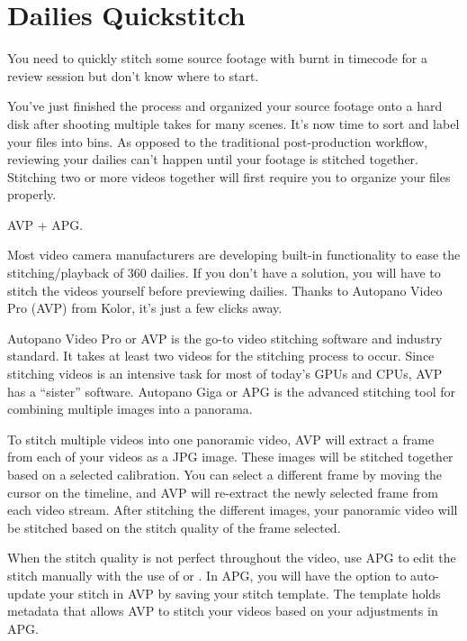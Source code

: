 \section{Dailies Quickstitch}
\pagecolor{white}
\label{chap:30}
\begin{fullwidth}

\problem

{\large You need to quickly stitch some source footage with burnt in timecode for a review session but don't know where to start. \par}

You've just finished the \textbf{} process and organized your source footage onto a hard disk after shooting multiple takes for many scenes. It's now time to sort and label your files into bins. As opposed to the traditional post-production workflow, reviewing your dailies can't happen until your footage is stitched together. Stitching two or more videos together will first require you to organize your files properly.

\solution

{\large AVP + APG. \par}

Most video camera manufacturers are developing built-in functionality to ease the stitching/playback of 360 dailies. If you don't have a \textbf{} solution, you will have to stitch the videos yourself before previewing dailies. Thanks to Autopano Video Pro (AVP) from Kolor, it's just a few clicks away.

Autopano Video Pro or AVP is the go-to video stitching software and industry standard. It takes at least two videos for the stitching process to occur. Since stitching videos is an intensive task for most of today’s GPUs and CPUs, AVP has a “sister” software. Autopano Giga or APG is the advanced stitching tool for combining multiple images into a panorama. 

To stitch multiple videos into one panoramic video, AVP will extract a frame from each of your videos as a JPG image. These images will be stitched together based on a selected calibration. You can select a different frame by moving the cursor on the timeline, and AVP will re-extract the newly selected frame from each video stream. After stitching the different images, your panoramic video will be stitched based on the stitch quality of the frame selected. 


When the stitch quality is not perfect throughout the video, use APG to edit the stitch manually with the use of \textbf{} or \textbf{}. In APG, you will have the option to auto-update your stitch in AVP by saving your stitch template. The template holds metadata that allows AVP to stitch your videos based on your adjustments in APG.


\end{fullwidth}
